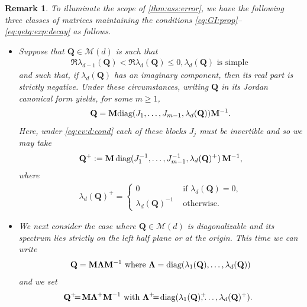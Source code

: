 \documentclass[9pt,twocolumn,twoside]{pnas-new}
\makeatletter
\newcommand{\?}{\textbf{?}}
\newcommand{\diag}{\textnormal{diag}}
\newcommand{\QQ}{\mathbf{Q}}
\newcommand{\LLambda}{\boldsymbol{\Lambda}}
\newcommand{\M}{\mathbf{M}}
\newtheorem{@remark}{\bf Remark}
\newenvironment{remark}{\begin{@remark}\rm}{\end{@remark}}
\makeatother
\begin{document}
\begin{remark}\label{rmk:mat:class:dcy}
  To illuminate the scope of \cref{thm:ass:error}, we have the
  following three classes of matrices maintaining the conditions
  \eqref{eq:GI:prop}--\eqref{eq:qetq:exp:decay} as follows.
  \begin{itemize}
  \item[(i)] Suppose that $\QQ \in \mathcal{M}(d)$ is such that
    \begin{align}\label{eq:ev:d:cond}
      \Re \lambda_{d-1}(\QQ) <  \Re \lambda_d({\mathbf Q}) \leq 0,
       \lambda_d({\mathbf Q})  \text{ is simple }
    \end{align}
    and such that, if $\lambda_d({\mathbf Q})$ has an imaginary component,
    then its real part is strictly negative.  Under these
    circumstances, writing $\QQ$ in its Jordan canonical form yields,
    for some $m \geq 1$,
    \begin{equation}\label{e:Q=Jordan_decomp}
      \QQ = \M \diag (J_{1},\hdots,J_{m-1},\lambda_d(\QQ))\M^{-1}.
    \end{equation}
    Here, under \eqref{eq:ev:d:cond} each of
    these blocks $J_j$ must be invertible and so
    we may take
    \begin{align}
      \QQ^+ := \M \,
      \diag (J_{1}^{-1},\hdots,J_{m-1}^{-1},\lambda_d(\QQ)^{+})
      \, \M^{-1},
    \end{align}
    where 
    \begin{align}\label{eq:eig:gen:inv}
      \lambda_d(\QQ)^{+} =
      \begin{cases}
        0& \text{ if } \lambda_d(\QQ) = 0,\\
        \lambda_d(\QQ)^{-1}& \text{ otherwise.}
       \end{cases}
    \end{align}
  \item[(ii)] We next consider the case where $\QQ \in \mathcal{M}(d)$
    is diagonalizable and its spectrum lies strictly on the left half
    plane or at the origin.  This time we can write
    \begin{align}\label{eq:spec:decomp}
    \QQ = \M \LLambda \M^{-1} \text{ where }
      \LLambda = \diag (\lambda_1(\QQ), \ldots ,\lambda_d(\QQ))
    \end{align}
    and we set 
    \begin{align}\label{eq:gen:inv:diag}
     \! \!\! \!\QQ^+ \! \! \!= \!\M \LLambda^+\M^{-1} \text{ with }
      \LLambda^{+} \! \! \!= \! \diag (\lambda_1(\QQ)^+\!\! \! \!, \ldots
      ,\lambda_d(\QQ)^+).

\end{align}
\end{itemize}
\end{remark}
\end{document}
